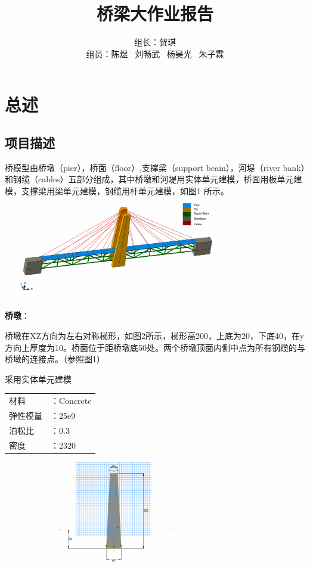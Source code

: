 \documentclass[UTF8]{ctexbook}
\title{桥梁大作业报告}
\author{组长：贺琪 \\ 组员：陈煜 \ 刘畅武 \ 杨昊光 \ 朱子霖}
\begin{document}
\maketitle

\tableofcontents

\newpage
\section{总述}
\subsection{项目描述}
桥模型由桥墩（pier），桥面（floor）,支撑梁（support beam），河堤（river bank）和钢缆（cables）五部分组成，其中桥墩和河堤用实体单元建模，桥面用板单元建模，支撑梁用梁单元建模，钢缆用杆单元建模，如图1 所示。\\

\includegraphics[width=0.8\textwidth]{01.png} %

\textbf{桥墩}：

桥墩在XZ方向为左右对称梯形，如图2所示，梯形高200，上底为20，下底40，在y方向上厚度为10。桥面位于距桥墩底50处。两个桥墩顶面内侧中点为所有钢缆的与桥墩的连接点。（参照图1）

采用实体单元建模

\begin{center}
\begin{tabular}{ll}
材料&：Concrete\\
弹性模量&：25e9\\
泊松比&：0.3\\
密度&：2320\\
\end{tabular}
\end{center}


\includegraphics[width=0.8\textwidth]{02.png}
\end{document}
